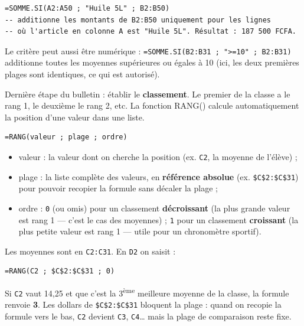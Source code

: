 \documentclass[11pt]{article}
\newcommand{\cle}[1]{{\popxbold\color{popdark}#1}}
\newcounter{popsec}
\newcounter{popsub}
\newcommand{\courssub}[1]{%
  \stepcounter{popsub}%
  \par\vspace{9pt}\noindent{\popxbold\fontsize{11.5}{13}\selectfont\color{popink}{\color{poporange}\thepopsec.\thepopsub}\hspace{6pt}#1}\par\nopagebreak\vspace{4pt}
}
\begin{document}
\begin{exemplebox}
\begin{lstlisting}
=SOMME.SI(A2:A50 ; "Huile 5L" ; B2:B50)
-- additionne les montants de B2:B50 uniquement pour les lignes
-- où l'article en colonne A est "Huile 5L". Résultat : 187 500 FCFA.
\end{lstlisting}
Le critère peut aussi être numérique : \texttt{=SOMME.SI(B2:B31 ; ">=10" ; B2:B31)} additionne toutes les moyennes supérieures ou égales à 10 (ici, les deux premières plages sont identiques, ce qui est autorisé).
\end{exemplebox}

\courssub{RANG() : classer les élèves}

Dernière étape du bulletin : établir le \textbf{classement}. Le premier de la classe a le rang 1, le deuxième le rang 2, etc. La fonction \cle{RANG()} calcule automatiquement la position d'une valeur dans une liste.

\begin{propriete}
\begin{lstlisting}
=RANG(valeur ; plage ; ordre)
\end{lstlisting}
\begin{itemize}
  \item \cle{valeur} : la valeur dont on cherche la position (ex. \texttt{C2}, la moyenne de l'élève) ;
  \item \cle{plage} : la liste complète des valeurs, en \textbf{référence absolue} (ex. \texttt{\$C\$2:\$C\$31}) pour pouvoir recopier la formule sans décaler la plage ;
  \item \cle{ordre} : \texttt{0} (ou omis) pour un classement \textbf{décroissant} (la plus grande valeur est rang 1 — c'est le cas des moyennes) ; \texttt{1} pour un classement \textbf{croissant} (la plus petite valeur est rang 1 — utile pour un chronomètre sportif).
\end{itemize}
\end{propriete}

\begin{exemplebox}
Les moyennes sont en \texttt{C2:C31}. En \texttt{D2} on saisit :
\begin{lstlisting}
=RANG(C2 ; $C$2:$C$31 ; 0)
\end{lstlisting}
Si \texttt{C2} vaut 14,25 et que c'est la 3\textsuperscript{ème} meilleure moyenne de la classe, la formule renvoie \textbf{3}. Les dollars de \texttt{\$C\$2:\$C\$31} bloquent la plage : quand on recopie la formule vers le bas, \texttt{C2} devient \texttt{C3}, \texttt{C4}\dots{} mais la plage de comparaison reste fixe.
\end{exemplebox}
\end{document}
